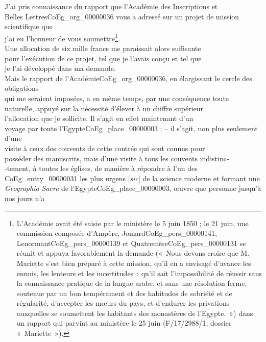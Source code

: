 \documentclass{book}
\begin{document}
\indent J’ai pris connaissance du rapport que l’Académie des Inscriptions et\\
Belles Lettres\gls{CoEg_org_00000036} vous a adressé sur un projet de mission scientifique que\\
j’ai eu l’honneur de vous soumettre\footnote{L'Académie avait été saisie par le ministère le 5 juin 1850 ; le 21 juin, une commission composée d’Ampère, Jomard\gls{CoEg_pers_00000141}, Lenormant\gls{CoEg_pers_00000139} et Quatremère\gls{CoEg_pers_00000131} se réunit et appuya favorablement la demande («~Nous devons croire que M. Mariette s’est bien préparé à cette mission, qu’il en a envisagé d’avance les ennuis, les lenteurs et les incertitudes~: qu’il sait l’impossibilité de réussir sans la connaissance pratique de la langue arabe, et sans une résolution ferme, soutenue par un bon tempérament et des habitudes de sobriété et de régularité, d’accepter les mœurs du pays, et d’endurer les privations auxquelles se soumettent les habitants des monastères de l’Egypte.~») dans un rapport qui parvint au ministère le 25 juin (F/17/2988/1, dossier «~Mariette~»).}.\\
\indent Une allocation de six mille francs me paraissait alors suffisante\\
pour l’exécution de ce projet, tel que je l’avais conçu et tel que\\
je l’ai développé dans ma demande.\\
\indent Mais le rapport de l’Académie\gls{CoEg_org_00000036}, en élargissant le cercle des obligations\\
qui me seraient imposées, a en même temps, par une conséquence toute\\
naturelle, appuyé sur la nécessité d’élever à un chiffre supérieur\\
l’allocation que je sollicite. Il s’agit en effet maintenant d’un\\
voyage par toute l’Egypte\gls{CoEg_place_00000003} ; – il s’agit, non plus seulement d’une\\
visite à ceux des couvents de cette contrée qui sont connus pour\\
posséder des manuscrits, mais d’une visite à tous les couvents indistinc-\\
-tement, à toutes les églises, de manière à répondre à l’un des\\
\gls{CoEg_entry_00000031} les plus urgens [\textit{sic}] de la science moderne et formant une\\
\textit{Geographia Sacra} de l’Egypte\gls{CoEg_place_00000003}, œuvre que personne jusqu’à nos jours n’a\\
\end{document}
